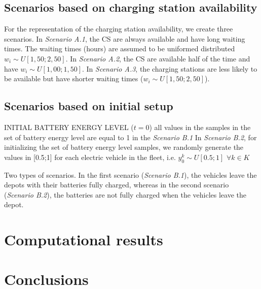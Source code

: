\documentclass[11pt]{article}
\begin{document}
\subsection{Scenarios based on charging station availability}
For the representation of the charging station availability, we create three scenarios. In \textit{Scenario A.1}, the CS are always available and have long waiting times. The waiting times (hours) are assumed to be uniformed distributed $w_i \sim U[1,50;2,50]$. In \textit{Scenario A.2}, the CS are available half of the time and have $w_i \sim U[1,00;1,50]$. In \textit{Scenario A.3}, the charging stations are less likely to be available but have shorter waiting times ($w_i \sim U[1,50;2,50]$).


\subsection{Scenarios based on initial setup}
INITIAL BATTERY ENERGY LEVEL  ($t = 0$)
all values in the samples in the set of battery energy level are equal to 1 in the \textit{Scenario B.1}
In \textit{Scenario B.2}, for initializing the set of battery energy level samples, we randomly generate the values in [0.5;1] for each electric vehicle in the fleet, i.e. $y^k_0 \sim U[0.5;1]$ $\forall k \in K$ 

Two types of scenarios. In the first scenario (\textit{Scenario B.1}), the vehicles leave the depots with their batteries fully charged, whereas in the second scenario (\textit{Scenario B.2}), the batteries are not fully charged when the vehicles leave the depot. 


\section{Computational results}
\label{section:results}


\section{Conclusions}
\label{section:conclusion}
\end{document}
